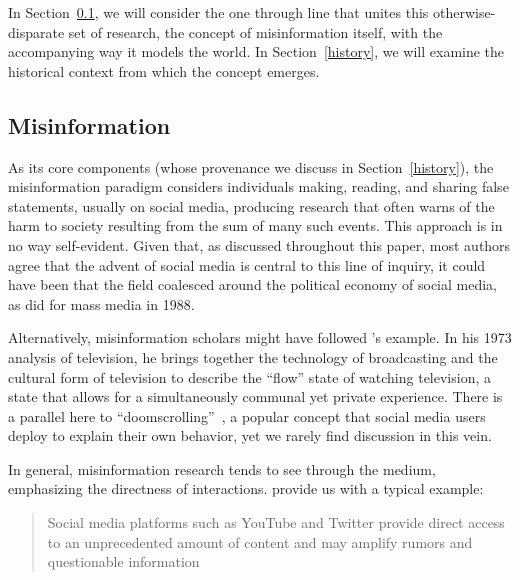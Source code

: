 \documentclass[          
 pre,
 twocolumn,
 twoside,
 superscriptaddress,
 amsmath,
 amssymb,                
 apsf
]{revtex4-2}
\begin{document}
In Section~\ref{concept}, we will consider the one through line that unites this otherwise-disparate set of research, the concept of misinformation itself, with the accompanying way it models the world. In Section~\ref{history}, we will examine the historical context from which the concept emerges.


\subsection{Misinformation}
\label{concept}

As its core components (whose provenance we discuss in Section~\ref{history}), the misinformation paradigm considers individuals making, reading, and sharing false statements, usually on social media, producing research that often warns of the harm to society resulting from the sum of many such events. This approach is in no way self-evident. Given that, as discussed throughout this paper, most authors agree that the advent of social media is central to this line of inquiry, it could have been that the field coalesced around the political economy of social media, as \citet{chomsky1988manufacturing} did for mass media in 1988. 

Alternatively, misinformation scholars might have followed \citet{williamsTelevisionTechnologyCultural2004}'s example. In his 1973 analysis of television, he brings together the technology of broadcasting and the cultural form of television to describe the ``flow'' state of watching television, a state that allows for a simultaneously communal yet private experience. There is a parallel here to ``doomscrolling''~\cite{priceDoomscrollingCOVID19Negative2022}, a popular concept that social media users deploy to explain their own behavior, yet we rarely find discussion in this vein.

In general, misinformation research tends to see through the medium, emphasizing the directness of interactions. \citet{cinelliCOVID19SocialMedia2020} provide us with a typical example:

\begin{quote}
Social media platforms such as YouTube and Twitter provide direct access to an unprecedented amount of content and may amplify rumors and questionable information
\end{quote}
\end{document}
